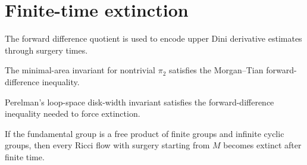 \chapter{Finite-time extinction}

\begin{definition}
  \label{def:forward-difference-quotient}
  The forward difference quotient is used to encode upper Dini derivative
  estimates through surgery times.
\end{definition}

\begin{theorem}
  \label{thm:W2-forward-difference}
  \notready
  The minimal-area invariant for nontrivial $\pi_2$ satisfies the Morgan--Tian
  forward-difference inequality.
\end{theorem}

\begin{theorem}
  \label{thm:loop-space-width-forward-difference}
  \notready
  Perelman's loop-space disk-width invariant satisfies the forward-difference
  inequality needed to force extinction.
\end{theorem}

\begin{theorem}
  \label{thm:finite-time-extinction}
  \notready
  If the fundamental group is a free product of finite groups and infinite
  cyclic groups, then every Ricci flow with surgery starting from $M$ becomes
  extinct after finite time.
\end{theorem}
